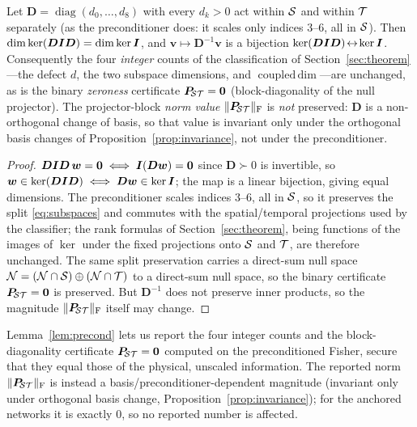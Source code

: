 \begin{lemma}
\label{lem:precond}
Let $\bm D=\operatorname{diag}(d_0,\dots,d_8)$ with every $d_k>0$ act within $\mathcal{S}$ and
within $\mathcal{T}$ separately (as the preconditioner does: it scales only indices $3$--$6$, all
in $\mathcal{S}$). Then $\dim\ker(\bm D\bm{I}\bm D)=\dim\ker\bm{I}$, and $\bm v\mapsto\bm D^{-1}\bm v$
is a bijection $\ker(\bm D\bm{I}\bm D)\!\leftrightarrow\!\ker\bm{I}$. Consequently the four
\emph{integer} counts of the classification of Section~\ref{sec:theorem}---the defect $d$,
the two subspace dimensions, and $\operatorname{coupled\,dim}$---are unchanged, as is the
binary \emph{zeroness} certificate $\bm{P}_{\!\mathcal{S}\mathcal{T}}=\bm0$ (block-diagonality of the null projector).
The projector-block \emph{norm value} $\lVert\bm{P}_{\!\mathcal{S}\mathcal{T}}\rVert_{\mathrm F}$ is \emph{not} preserved:
$\bm D$ is a non-orthogonal change of basis, so that value is invariant only under the
orthogonal basis changes of Proposition~\ref{prop:invariance}, not under the preconditioner.
\end{lemma}

\begin{proof}
$\bm D\bm{I}\bm D\,\bm w=\bm 0 \iff \bm{I}(\bm D\bm w)=\bm 0$ since $\bm D\succ0$ is
invertible, so $\bm w\in\ker(\bm D\bm{I}\bm D)\iff\bm D\bm w\in\ker\bm{I}$; the map is a
linear bijection, giving equal dimensions. The preconditioner scales indices $3$--$6$,
all in $\mathcal{S}$, so it preserves the split \eqref{eq:subspaces} and commutes with the
spatial/temporal projections used by the classifier; the rank formulas of
Section~\ref{sec:theorem}, being functions of the images of $\ker$ under the fixed
projections onto $\mathcal{S}$ and $\mathcal{T}$, are therefore unchanged. The same split preservation
carries a direct-sum null space $\mathcal{N}=(\mathcal{N}\cap\mathcal{S})\oplus(\mathcal{N}\cap\mathcal{T})$ to a direct-sum
null space, so the binary certificate $\bm{P}_{\!\mathcal{S}\mathcal{T}}=\bm0$ is preserved. But $\bm D^{-1}$ does not
preserve inner products, so the magnitude $\lVert\bm{P}_{\!\mathcal{S}\mathcal{T}}\rVert_{\mathrm F}$ itself may change.
\end{proof}

\noindent Lemma~\ref{lem:precond} lets us report the four integer counts and the
block-diagonality certificate $\bm{P}_{\!\mathcal{S}\mathcal{T}}=\bm0$ computed on the preconditioned Fisher, secure that
they equal those of the physical, unscaled information. The reported norm
$\lVert\bm{P}_{\!\mathcal{S}\mathcal{T}}\rVert_{\mathrm F}$ is instead a basis/preconditioner-dependent magnitude
(invariant only under orthogonal basis change, Proposition~\ref{prop:invariance}); for the
anchored networks it is exactly $0$, so no reported number is affected.
